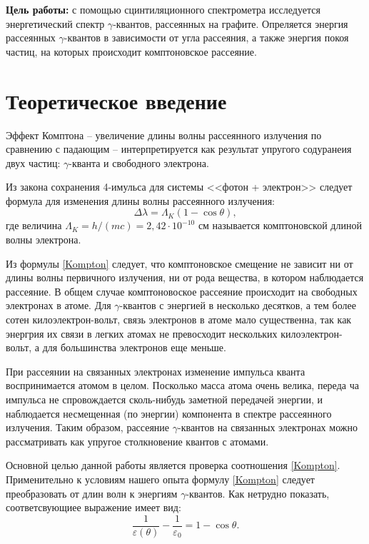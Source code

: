 \textbf{Цель работы:} с помощью сцинтиляционного спектрометра исследуется энергетический спектр $\gamma$-квантов, рассеянных на графите. Опреляется энергия рассеянных $\gamma$-квантов в зависимости от угла рассеяния, а также энергия покоя частиц, на которых происходит комптоновское рассеяние.

\section{Теоретическое введение}

    Эффект Комптона -- увеличение длины волны рассеянного излучения по сравнению с падающим -- интерпретируется как результат упругого содуранеия двух частиц: $\gamma$-кванта и свободного электрона.
	
	Из закона сохранения 4-имульса для системы <<фотон + электрон>> следует формула для изменения длины волны рассеянного излучения:
	\begin{equation}
		\label{Kompton}
		\tag{$\star$}
		\Delta \lambda = \Lambda_K(1-\cos\theta),
	\end{equation}
	где величина $\Lambda_K = h/(mc) = 2,42 \cdot 10^{-10}$ см называется комптоновской длиной волны электрона.
	
	Из формулы \eqref{Kompton} следует, что комптоновское смещение не зависит ни от длины волны первичного излучения, ни от рода вещества, в котором наблюдается рассеяние. В общем случае комптоновоское рассеяние происходит на свободных электронах в атоме. Для $\gamma$-квантов с энергией в несколько десятков, а тем более сотен килоэлектрон-вольт, связь электронов в атоме мало существенна, так как энергрия их связи в легких атомах не превосходит нескольких килоэлектрон-вольт, а для большинства электронов еще меньше.
	
	При рассеянии на связанных электронах изменение импульса кванта воспринимается атомом в целом. Посколько масса атома очень велика, переда ча импульса не спровождается сколь-нибудь заметной передачей энергии, и наблюдается несмещенная (по энергии) компонента в спектре рассеянного излучения. Таким образом, рассеяние $\gamma$-квантов на связанных электронах можно рассматривать как упругое столкновение квантов с атомами.
	
	Основной целью данной работы является проверка соотношения \eqref{Kompton}. Применительно к условиям нашего опыта формулу \eqref{Kompton} следует преобразовать от длин волн к энергиям $\gamma$-квантов. Как нетрудно показать, соответсвующиее выражение имеет вид:
	\begin{equation}
		\label{1-cos}
		\tag{$\star\star$}
		\frac{1}{\varepsilon(\theta)} - \frac{1}{\varepsilon_0} = 1 - \cos \theta.
	\end{equation}

